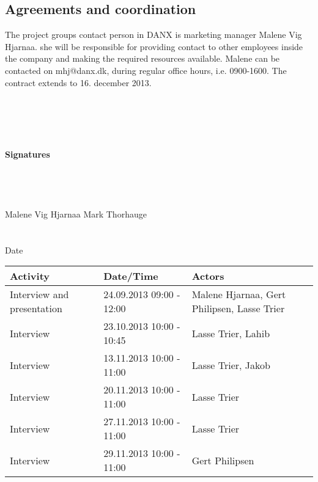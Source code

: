 \documentclass[pdftext, 12pt, a4paper]{report}
\begin{document}
\subsection*{Agreements and coordination}
The project groups contact person in DANX is marketing manager Malene Vig Hjarnaa. she will be responsible for providing contact to other employees inside the company and making the required resources available. Malene can be contacted on mhj@danx.dk, during regular office hours, i.e. 0900-1600. The contract extends to 16. december 2013.
\\ \\ \\ \\ \\ \\
\textbf{Signatures}
\\ \\ \\ \\
\underline{\hspace{9em}} \hspace*{12.8em} \underline{\hspace{9em}}
\\
Malene Vig Hjarnaa \hspace*{13em} Mark Thorhauge
\\ \\ \\
Date \underline{\hspace{9em}}
\newpage
\begin{tabular}{ | p{3.8cm} || p{4.5cm} | p{4.5cm} | }
\hline
\textbf{Activity} & \textbf{Date/Time} & \textbf{Actors}\\ \hline \hline
Interview and presentation & 24.09.2013 09:00 - 12:00 & Malene Hjarnaa, Gert Philipsen, Lasse Trier \\ \hline
Interview & 23.10.2013 10:00 - 10:45 & Lasse Trier, Lahib \\ \hline
Interview & 13.11.2013 10:00 - 11:00 & Lasse Trier, Jakob \\ \hline
Interview & 20.11.2013 10:00 - 11:00 & Lasse Trier \\ \hline
Interview & 27.11.2013 10:00 - 11:00 & Lasse Trier \\ \hline
Interview & 29.11.2013 10:00 - 11:00 & Gert Philipsen \\ \hline
\end{tabular}
\end{document}
